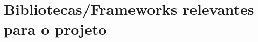 \begin{comment}
"Python é uma linguagem de programação de alto nível e propósito geral. A sua filosofia
de design enfatiza a legibilidade do código com o uso de indentação significativa.

Python é dinamicamente tipada e possui coleta de lixo automática. 
Suporta múltiplos paradigmas de programação, incluindo estruturada (particularmente 
procedural), orientada a objetos e programação funcional. É frequentemente descrita como 
uma linguagem "com tudo incluído", devido à sua biblioteca padrão abrangente." \cite{python}



As principais cracteriasaticas desta linguagem são:

\begin{itemize}
\item \textbf{Sintaxe Clara e Concisa}: Python é conhecido pela sua sintaxe limpa
e fácil de ler, o que a torna ideal para iniciantes e facilita a manutenção de código;
\item \textbf{Tipagem Dinâmica}: Em Python, não é necessário declarar explicitamente o
tipo de uma variável. O tipo é inferido dinamicamente durante a execução do programa;
\item \textbf{Multiparadigma}: Python suporta diversos paradigmas de programação,
incluindo programação orientada a objetos, programação imperativa e programação funcional;
\item \textbf{Biblioteca Padrão Abrangente}: Python vem com uma vasta biblioteca 
padrão que oferece suporte para uma ampla gama de tarefas, desde manipulação de arquivos 
até desenvolvimento web;
\item \textbf{Comunidade Ativa}:Python possui uma comunidade enorme e ativa de 
desenvolvedores em todo o mundo. Isto resulta numa grande quantidade
de recursos disponíveis, como bibliotecas de terceiros, frameworks e ferramentas 
de desenvolvimento.
\end{itemize}


"Python é suficientemente rápido para o nosso site e permite-nos produzir funcionalidades 
mantíveis em tempos recorde, com um mínimo de programadores." \cite{pyyt}

\end{comment}






\section{Bibliotecas/Frameworks relevantes para o projeto}



